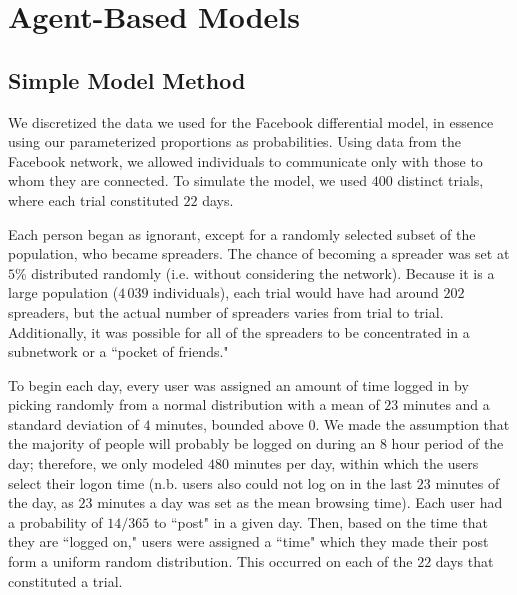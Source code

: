 \section{Agent-Based Models }
\label{sec:abmodel}

\subsection{Simple Model Method}
\label{subsec:abmodelsetup}

\noindent We discretized the data we used for the Facebook differential model, in essence using our parameterized proportions as probabilities. Using data from the Facebook network, we allowed individuals to communicate only with those to whom they are connected. To simulate the model, we used $ 400 $ distinct trials, where each trial constituted $ 22 $ days.

Each person began as ignorant, except for a randomly selected subset of the population, who became spreaders. The chance of becoming a spreader was set at $ 5\% $ distributed randomly (i.e. without considering the network). Because it is a large population ($ 4\,039 $ individuals), each trial would have had around $ 202 $ spreaders, but the actual number of spreaders varies from trial to trial. Additionally,  it was possible for all of the spreaders to be concentrated in a subnetwork or a ``pocket of friends."

To begin each day, every user was assigned an amount of time logged in by picking randomly from a normal distribution with a mean of $ 23 $ minutes and a standard deviation of $ 4 $ minutes, bounded above $ 0 $. We made the assumption that the majority of people will probably be logged on during an $8$ hour period of the day; therefore, we only modeled $480$ minutes per day, within which the users select their logon time (n.b. users also could not log on in the last $ 23 $ minutes of the day, as $ 23 $ minutes a day was set as the mean browsing time). Each user had a probability of $14/365$ to ``post" in a given day. Then, based on the time that they are ``logged on," users were assigned a ``time" which they made their post form a uniform random distribution. This occurred on each of the $ 22 $ days that constituted a trial.

